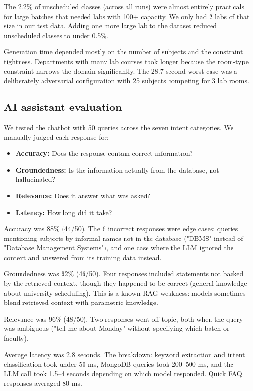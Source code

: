 \documentclass[conference]{IEEEtran}
\begin{document}
The 2.2\% of unscheduled classes (across all runs) were almost entirely practicals for large batches that needed labs with 100+ capacity. We only had 2 labs of that size in our test data. Adding one more large lab to the dataset reduced unscheduled classes to under 0.5\%.

Generation time depended mostly on the number of subjects and the constraint tightness. Departments with many lab courses took longer because the room-type constraint narrows the domain significantly. The 28.7-second worst case was a deliberately adversarial configuration with 25 subjects competing for 3 lab rooms.

\subsection{AI assistant evaluation}

We tested the chatbot with 50 queries across the seven intent categories. We manually judged each response for:

\begin{itemize}
\item \textbf{Accuracy:} Does the response contain correct information?
\item \textbf{Groundedness:} Is the information actually from the database, not hallucinated?
\item \textbf{Relevance:} Does it answer what was asked?
\item \textbf{Latency:} How long did it take?
\end{itemize}

Accuracy was 88\% (44/50). The 6 incorrect responses were edge cases: queries mentioning subjects by informal names not in the database ("DBMS" instead of "Database Management Systems"), and one case where the LLM ignored the context and answered from its training data instead.

Groundedness was 92\% (46/50). Four responses included statements not backed by the retrieved context, though they happened to be correct (general knowledge about university scheduling). This is a known RAG weakness: models sometimes blend retrieved context with parametric knowledge.

Relevance was 96\% (48/50). Two responses went off-topic, both when the query was ambiguous ("tell me about Monday" without specifying which batch or faculty).

Average latency was 2.8 seconds. The breakdown: keyword extraction and intent classification took under 50 ms, MongoDB queries took 200--500 ms, and the LLM call took 1.5--4 seconds depending on which model responded. Quick FAQ responses averaged 80 ms.
\end{document}
